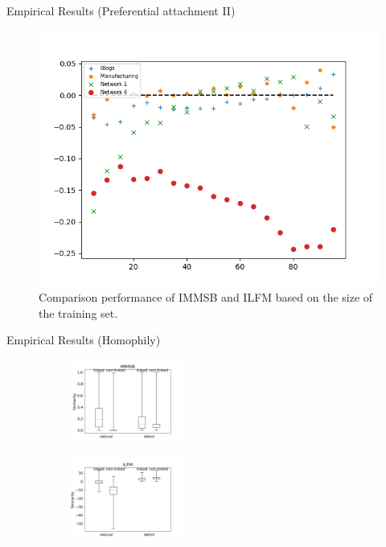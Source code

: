 \begin{frame}[c]{Empirical Results (Preferential attachment II)}
        \begin{figure}[h]
            \caption{Comparison performance of IMMSB and ILFM based on the size of the training set.}
        \includegraphics[scale=0.5]{img/testset_max_20_roc_evolution}
        \end{figure}
\end{frame}


\begin{frame}[c]{Empirical Results (Homophily)}
    \begin{figure}[ht]
    \caption{Natural and latent similarities aggregated over all datasets and computed on linked and non-linked pairs of nodes for IMMSB (left) and ILFM (right).}
    \centering
        \begin{subfigure}
             \centering
                 \includegraphics[width=0.4\textwidth]{img/homo_mustach_immsb}
        \end{subfigure}
        \begin{subfigure}
                 \centering
              \includegraphics[width=0.4\textwidth]{img/homo_mustach_ilfm}
        \end{subfigure}
        \label{fig:homo_mustach}
    \end{figure}
\end{frame}


